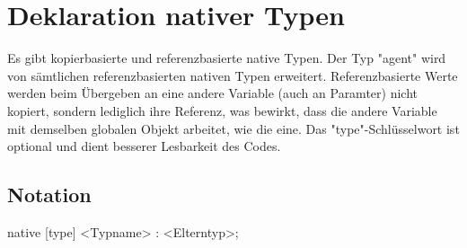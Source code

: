 \chapter{Deklaration nativer Typen}

Es gibt kopierbasierte und referenzbasierte native Typen. Der Typ "agent" wird von sämtlichen referenzbasierten nativen Typen erweitert.
Referenzbasierte Werte werden beim Übergeben an eine andere Variable (auch an Paramter) nicht kopiert, sondern lediglich ihre Referenz,
was bewirkt, dass die andere Variable mit demselben globalen Objekt arbeitet, wie die eine.
Das "type"-Schlüsselwort ist optional und dient besserer Lesbarkeit des Codes.

\section{Notation}
native [type] <Typname> : <Elterntyp>;